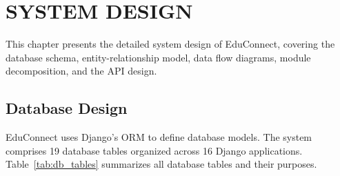\newpage
\section{SYSTEM DESIGN}
\hline

This chapter presents the detailed system design of EduConnect, covering the database schema, entity-relationship model, data flow diagrams, module decomposition, and the API design.

\subsection{Database Design}

EduConnect uses Django's ORM to define database models. The system comprises 19 database tables organized across 16 Django applications. Table~\ref{tab:db_tables} summarizes all database tables and their purposes.

